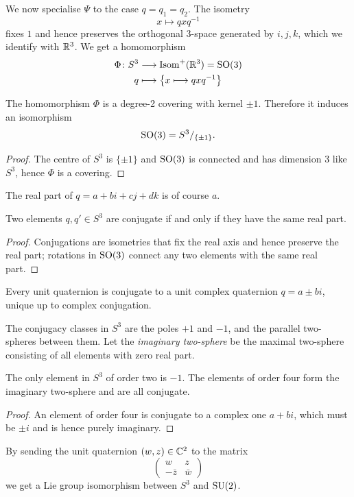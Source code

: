 We now specialise $\Psi$ to the case $q=q_1=q_2$. The isometry
$$x \longmapsto qxq^{-1}$$
fixes $1$ and hence preserves the orthogonal 3-space generated by $i,j,k$, which we identify with $\mathbb{R}^3$. We get a homomorphism
\begin{align*}
\Phi\colon S^3 & \longrightarrow {\rm Isom}^+(\mathbb{R}^3) = {\rm SO}(3) \\
q & \longmapsto \left\{x \longmapsto qxq^{-1}\right\}
\end{align*}
\begin{prop}
The homomorphism $\Phi$ is a degree-2 covering with kernel $\pm 1$. Therefore it induces an isomorphism
$${\rm SO}(3) = S^3/_{\{\pm 1\}}.$$
\end{prop}
\begin{proof}
The centre of $S^3$ is $\{\pm 1\}$ and ${\rm SO}(3)$ is connected and has dimension 3 like $S^3$, hence $\Phi$ is a covering.
\end{proof}
The real part of $q=a+bi+cj+dk$ is of course $a$.
\begin{cor}
Two elements $q,q' \in S^3$ are conjugate if and only if they have the same real part.
\end{cor}
\begin{proof}
Conjugations are isometries that fix the real axis and hence preserve the real part; rotations in ${\rm SO}(3)$ connect any two elements with the same real part.
\end{proof}
\begin{cor} \label{unit:complex:cor}
Every unit quaternion is conjugate to a unit complex quaternion $q=a\pm bi$, unique up to complex conjugation.
\end{cor}
The conjugacy classes in $S^3$ are the poles $+1$ and $-1$, and the parallel two-spheres between them. Let the \emph{imaginary two-sphere} be the maximal two-sphere consisting of all elements with zero real part.
\begin{cor}
The only element in $S^3$ of order two is $-1$. The elements of order four form the imaginary two-sphere and are all conjugate.
\end{cor}
\begin{proof}
An element of order four is conjugate to a complex one $a+bi$, which must be $\pm i$ and is hence purely imaginary.
\end{proof}

\begin{ex}
By sending the unit quaternion $(w,z)\in\mathbb{C}^2$ to the matrix
$$\begin{pmatrix} w & z \\ -\bar z & \bar w \end{pmatrix}$$
we get a Lie group isomorphism between $S^3$ and ${\rm SU}(2)$.
\end{ex}

